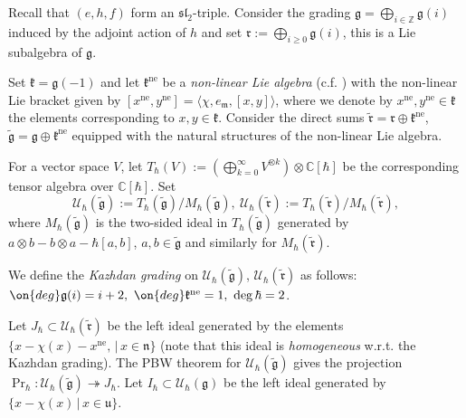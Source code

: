\documentclass[12pt]{amsart}
\begin{document}
Recall that $(e,h,f)$ form an $\mathfrak{sl}_2$-triple. 
Consider the grading $\mathfrak{g}=\bigoplus_{i \in \mathbb{Z}}\mathfrak{g}(i)$ induced by the adjoint action of $h$ and set $\mathfrak{r}:=\bigoplus_{i \geqslant 0}\mathfrak{g}(i)$, this is a Lie subalgebra of $\mathfrak{g}$.


Set $\mathfrak{k} = \mathfrak{g}(-1)$ and let $\mathfrak{k}^{\mathrm{ne}}$ be a {\emph{non-linear Lie algebra}} (c.f. \cite[beginning of Section 2.2]{BGK}) with the non-linear Lie bracket given by $[x^{\mathrm{ne}},y^{\mathrm{ne}}]=\langle \chi,e_{\mathfrak{m}},[x,y]\rangle$, where we denote by $x^{\mathrm{ne}}, y^{\mathrm{ne}} \in \mathfrak{k}$ the elements corresponding to $x,y \in \mathfrak{k}$.
Consider the direct sums  $\widetilde{\mathfrak{r}} = \mathfrak{r} \oplus \mathfrak{k}^{\mathrm{ne}}$,  $\widetilde{\mathfrak{g}} = \mathfrak{g} \oplus \mathfrak{k}^{\mathrm{ne}}$ equipped with the natural structures of the non-linear Lie algebra. 



For a vector space $V$, let $T_{\hbar}(V):=(\bigoplus_{k=0}^\infty V^{\otimes k}) \otimes \mathbb{C}[\hbar]$ be the corresponding tensor algebra over $\mathbb{C}[\hbar]$. 
Set 
\begin{equation*}
\mathcal{U}_\hbar(\widetilde{\mathfrak{g}}) := T_\hbar(\widetilde{\mathfrak{g}})/M_\hbar(\widetilde{\mathfrak{g}}),~
\mathcal{U}_\hbar(\widetilde{\mathfrak{r}}) := T_\hbar(\widetilde{\mathfrak{r}})/M_\hbar(\widetilde{\mathfrak{r}}),
\end{equation*}
where $M_\hbar(\widetilde{\mathfrak{g}})$ is the two-sided ideal in $T_\hbar(\widetilde{\mathfrak{g}})$ generated by $a \otimes b - b \otimes a -\hbar[a,b]$, $a,b \in \widetilde{\mathfrak{g}}$ and similarly for $M_\hbar(\widetilde{\mathfrak{r}})$.


We define the {\emph{Kazhdan grading}} on  $\mathcal{U}_\hbar(\widetilde{\mathfrak{g}})$, $\mathcal{U}_\hbar(\widetilde{\mathfrak{r}})$ as follows:
$
\on{deg}\mathfrak{g}(i)=i+2,~\on{deg}\mathfrak{k}^{\mathrm{ne}}=1,~\operatorname{deg}\hbar=2$. 



Let $J_{\hbar} \subset \mathcal{U}_\hbar(\widetilde{\mathfrak{r}})$ be the left ideal generated by  the elements $\{x-\chi(x)-x^{\mathrm{ne}},\,|\, x \in \mathfrak{n}\}$ (note that this ideal is {\emph{homogeneous}} w.r.t. the Kazhdan grading). The PBW theorem for $\mathcal{U}_\hbar(\widetilde{\mathfrak{g}})$ gives the projection %
$\operatorname{Pr}_{\hbar}\colon \mathcal{U}_\hbar(\widetilde{\mathfrak{g}}) \twoheadrightarrow J_\hbar$. Let $I_\hbar \subset \mathcal{U}_{\hbar}(\mathfrak{g})$ be the left ideal generated by $\{x-\chi(x)\,|\, x \in \mathfrak{u}\}$. 
\end{document}
